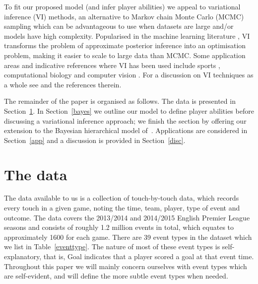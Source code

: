 \documentclass[11pt,a4paper]{article}
\begin{document}
To fit our proposed model (and infer player abilities) we appeal to variational inference (VI) 
methods, an alternative to Markov chain Monte Carlo (MCMC) 
sampling which can be advantageous to use when datasets are large 
and/or models have high complexity. Popularised in the machine learning 
literature \citep{jordan_1999, wainwright_2008}, 
VI transforms the problem of approximate posterior inference into an 
optimisation problem, making it easier to scale to large data than MCMC. 
Some application areas and indicative references where VI has been used include 
sports \citep{kitani_2011, ruiz_2015, franks_2015}, 
computational biology \citep{carbonetto_2012, raj_2014}  
and computer vision \citep{blei_2006, sudderth_2009, du_2009}.  
For a discussion on VI techniques as a whole see \cite{blei_2017} and 
the references therein.

The remainder of the paper is organised as follows. The data is 
presented in Section~\ref{data}. In Section~\ref{bayes} we outline our 
model to define player abilities before discussing a variational 
inference approach; we finish the section by offering our extension 
to the Bayesian hierarchical model of~\cite{baio_2010}. Applications 
are considered in Section~\ref{app} and a discussion is provided in 
Section~\ref{disc}. 











\section{The data} \label{data}

The data available to us is a collection of touch-by-touch data, which 
records every touch in a given game, noting the time, team, player, 
type of event and outcome. 
The data covers the 2013/2014 and 2014/2015 
English Premier League seasons and consists of roughly 
1.2 million events in total, which equates to approximately 1600 for 
each game. There are 39 event types in the dataset which we list 
in Table~\ref{eventtype}. The nature of most of these event types is 
self-explanatory, that is, Goal indicates that a player scored a goal 
at that event time. Throughout this paper we will mainly concern 
ourselves with event types which are self-evident, and will define the 
more subtle event types when needed. 
\end{document}
